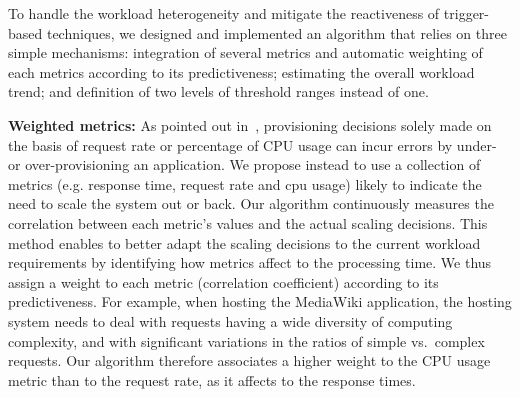 To handle the workload heterogeneity and mitigate the reactiveness of
trigger-based techniques, we designed and implemented an algorithm
that relies on three simple mechanisms: integration of several metrics
and automatic weighting of each metrics according to its
predictiveness; estimating the overall workload trend; and definition
of two levels of threshold ranges instead of one.

\vspace{2mm}


\textbf{Weighted metrics:} As pointed out
in~\cite{singh_autonomic_2010}, provisioning decisions solely made on
the basis of request rate or percentage of CPU usage can incur errors by under- or
over-provisioning an application. We propose instead to use a
collection of metrics (e.g. response time, request rate and cpu usage) likely to indicate the need to scale the system
out or back. Our algorithm continuously measures the correlation
between each metric's values and the actual scaling decisions. This method enables to better adapt the scaling decisions to the current workload requirements by identifying how metrics affect to the processing time. We thus
assign a weight to each metric (correlation coefficient) according to its predictiveness. For
example, when hosting the MediaWiki application, the hosting system
needs to deal with requests having a wide diversity of computing
complexity, and with significant variations in the ratios of simple
vs.\ complex requests. Our algorithm therefore associates a higher
weight to the CPU usage metric than to the request rate, as it affects to the response times.




